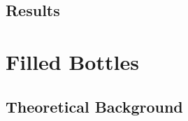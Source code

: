 \documentclass[a4paper,12pt]{article}
\begin{document}

\subsection{Results}


\newpage

\section{Filled Bottles}

\subsection{Theoretical Background}

\end{document}
